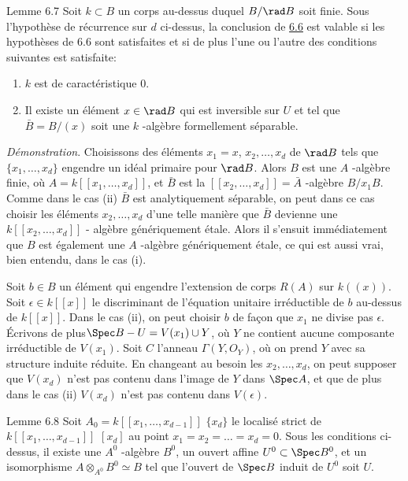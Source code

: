 \documentclass[10pt]{../fichiers-configuration-latex/smfart}
\begin{document}
\begin{enonce*}{Lemme 6.7}
Soit $k\subset B$ un corps au-dessus duquel $B/\rad B$ soit
finie. Sous l'hypothèse de récurrence sur $d$ ci-dessus, la conclusion
de \hyperref[XIX.lem6.6]{6.6} est valable si les hypothèses de $6.6$ sont satisfaites et si
de plus l'une ou l'autre des conditions suivantes est satisfaite:
\begin{enumerate}
\renewcommand{\theenumi}{\roman{enumi}}
\renewcommand{\labelenumi}{(\theenumi)}
\item $k$ est de caractéristique $0$.

\item Il existe un élément $x\in \rad B$ qui est inversible sur $U$ et
tel que $\bar{B}=B/(x)$ soit une $k$ -algèbre formellement séparable.
\end{enumerate}
\end{enonce*}

\medskip
\noindent
\emph{Démonstration}. Choisissons des éléments $x_{1}=x$,
$x_{2},\ldots, x_{d}$ de $\rad B$ tels que $\{x_{1},\ldots,x_{d}\}$
engendre un idéal primaire pour $\rad B$. Alors $B$ est une $A$
-algèbre finie, où $A=k[[x_{1},\ldots,x_{d}]]$, et $\bar{B}$ est la
$[[x_{2},\ldots, x_{d}]]=\bar{A}$ -algèbre $B/x_{1}B$. Comme dans le
cas (ii) $\bar{B}$ est analytiquement séparable, on peut dans ce cas
choisir les éléments $x_{2},\ldots,x_{d}$ d'une telle manière que
$\bar{B}$ devienne une $k[[x_{2},\ldots,x_{d}]]$ - algèbre
génériquement étale. Alors il s'ensuit immédiatement que $B$ est
également une $A$ -algèbre génériquement étale, ce qui est aussi vrai,
bien entendu, dans le cas (i).

Soit $b\in B$ un élément qui engendre l'extension de corps $R(A)$ sur
$k((x))$. Soit $\epsilon \in k[[x]]$ le discriminant de l'équation
unitaire irréductible de $b$ au-dessus de $k[[x]]$. Dans le cas (ii),
on peut choisir $b$ de façon que $x_{1}$ ne divise pas
$\epsilon$. Écrivons de plus\pageoriginale $\Spec B-U=V(x_{1})\cup Y$,
où $Y$ ne contient aucune composante irréductible de $V(x_{1})$. Soit
$C$ l'anneau $\Gamma(Y,O_{Y})$, où on prend $Y$ avec sa structure
induite réduite. En changeant au besoin les $x_{2},\ldots,x_{d}$, on
peut supposer que $V(x_{d})$ n'est pas contenu dans l'image de $Y$
dans $\Spec A$, et que de plus dans le cas (ii) $V(x_{d})$ n'est pas
contenu dans $V(\epsilon)$.

\begin{enonce*}{Lemme 6.8}
Soit $A_{0}=k[[x_{1},\ldots,x_{d-1}]]$ $\{x_{d}\}$ le localisé strict
de $k[[x_{1},\ldots,x_{d-1}]]$ $[x_{d}]$ au point
$x_{1}=x_{2}=\ldots=x_{d}=0$. Sous les conditions ci-dessus, il existe
une $A^{0}$ -algèbre $B^{0}$, un ouvert affine $U^{0}\subset \Spec
B^{0}$, et un isomorphisme $A\otimes_{A^{0}}B^{0}\simeq B$ tel que
l'ouvert de $\Spec B$ induit de $U^{0}$ soit $U$.
\end{enonce*}
\end{document}
